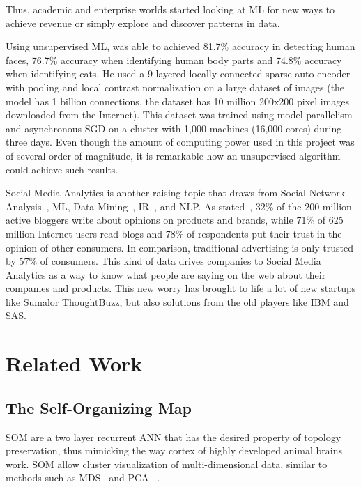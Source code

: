 \documentclass[journal]{IEEEtran}
\begin{document}
Thus, academic and enterprise worlds started looking at \ac{ML} for new ways to achieve revenue or simply explore and discover patterns in data. 

Using unsupervised \ac{ML}, \citet{Le2011} was able to achieved 81.7\% accuracy in detecting human faces, 76.7\% accuracy when identifying human body parts and 74.8\% accuracy when identifying cats. He used a 9-layered locally connected sparse auto-encoder with pooling and local contrast normalization on a large dataset of images (the model has 1 billion connections, the dataset has 10 million 200x200 pixel images downloaded from the Internet). This dataset was trained using model parallelism and asynchronous SGD on a cluster with 1,000 machines (16,000 cores) during three days. Even though the amount of computing power used in this project was of several order of magnitude, it is remarkable how an unsupervised algorithm could achieve such results.

Social Media Analytics is another raising topic that draws from Social Network Analysis~\cite{knoke2008social}, \ac{ML}, Data Mining~\cite{witten2005data}, \ac{IR}~\cite{salton1983introduction}, and \ac{NLP}. As stated~\citet{Melville2009}, 32\% of the 200 million active bloggers write about opinions on products and brands, while 71\% of 625 million Internet users read blogs and 78\% of respondents put their trust in the opinion of other consumers. In comparison, traditional advertising is only trusted by 57\% of consumers.
This kind of data drives companies to Social Media Analytics as a way to know what people are saying on the web about their companies and products. This new worry has brought to life a lot of new startups like Sumalor ThoughtBuzz, but also solutions from the old players like IBM and SAS.


\section{Related Work}
\label{sec:related_work}

\subsection{The Self-Organizing Map} 
\label{sec:the_self_organizing_map}

\ac{SOM} are a two layer recurrent \ac{ANN} that has the desired property of topology preservation, thus mimicking the way cortex of highly developed animal brains work. \ac{SOM} allow cluster visualization of multi-dimensional data, similar to methods such as \ac{MDS}~\cite{KruskalWish1978} and \ac{PCA}~\cite{Hotelling_1933} .  
\end{document}
